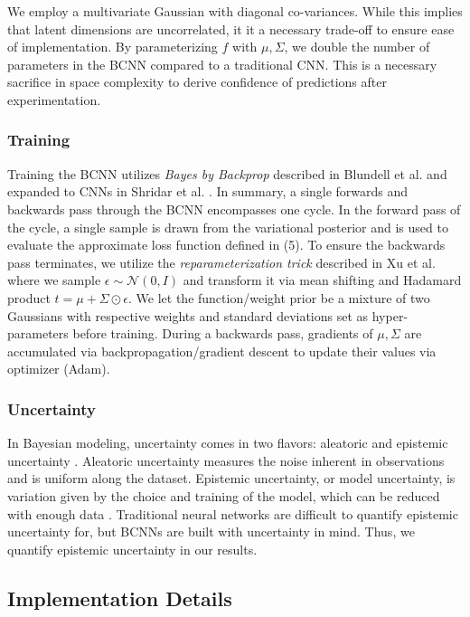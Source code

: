 We employ a multivariate Gaussian with diagonal co-variances. While this implies that latent dimensions are uncorrelated, it it a necessary trade-off to ensure ease of implementation. By parameterizing $f$ with $\mu, \Sigma$, we double the number of parameters in the BCNN compared to a traditional CNN. This is a necessary sacrifice in space complexity to derive confidence of predictions after experimentation.


\subsubsection{Training}

Training the BCNN utilizes \textit{Bayes by Backprop} described in Blundell et al. \cite{blundell2015weight} and expanded to CNNs in Shridar et al. \cite{shridhar2019comprehensive}. In summary, a single forwards and backwards pass through the BCNN encompasses one cycle. In the forward pass of the cycle, a single sample is drawn from the variational posterior and is used to evaluate the approximate loss function defined in (5). To ensure the backwards pass terminates, we utilize the \textit{reparameterization trick} described in Xu et al. \cite{xu2018variance} where we sample $\epsilon \sim \mathcal{N}(0, I)$ and transform it via mean shifting and Hadamard product $t = \mu + \Sigma \odot \epsilon$. We let the function/weight prior be a mixture of two Gaussians with respective weights and standard deviations set as hyper-parameters before training. During a backwards pass, gradients of $\mu, \Sigma$ are accumulated via backpropagation/gradient descent to update their values via optimizer (Adam).

\subsubsection{Uncertainty}

In Bayesian modeling, uncertainty comes in two flavors: aleatoric and epistemic uncertainty \cite{kiureghian2009uncertainty}. Aleatoric uncertainty measures the noise inherent in observations and is uniform along the dataset. Epistemic uncertainty, or model uncertainty, is variation given by the choice and training of the model, which can be reduced with enough data \cite{kendall2017uncertainties}. Traditional neural networks are difficult to quantify epistemic uncertainty for, but BCNNs are built with uncertainty in mind. Thus, we quantify epistemic uncertainty in our results.

\subsection{Implementation Details}


